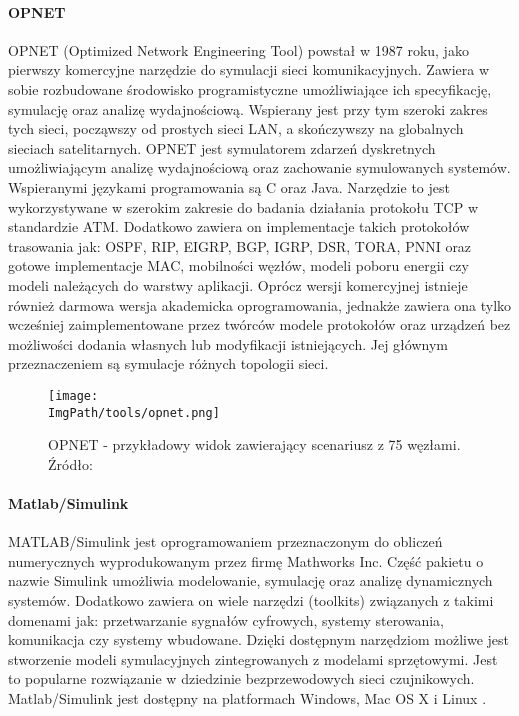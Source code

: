 \paragraph{OPNET \cite{Fahmy2016}}
OPNET (Optimized Network Engineering Tool) powstał w 1987 roku, jako pierwszy komercyjne narzędzie do symulacji sieci komunikacyjnych. Zawiera w sobie rozbudowane środowisko programistyczne umożliwiające ich specyfikację, symulację oraz analizę wydajnościową. Wspierany jest przy tym szeroki zakres tych sieci, począwszy od prostych sieci LAN, a skończywszy na globalnych sieciach satelitarnych. OPNET jest symulatorem zdarzeń dyskretnych umożliwiającym analizę wydajnościową oraz zachowanie symulowanych systemów. Wspieranymi językami programowania są C oraz Java. Narzędzie to jest wykorzystywane w szerokim zakresie do badania działania protokołu TCP w standardzie ATM. Dodatkowo zawiera on implementacje takich protokołów trasowania jak: OSPF, RIP, EIGRP, BGP, IGRP, DSR, TORA, PNNI oraz gotowe implementacje MAC, mobilności węzłów, modeli poboru energii czy modeli należących do warstwy aplikacji.
Oprócz wersji komercyjnej istnieje również darmowa wersja akademicka oprogramowania, jednakże zawiera ona tylko wcześniej zaimplementowane przez twórców modele protokołów oraz urządzeń bez możliwości dodania własnych lub modyfikacji istniejących. Jej głównym przeznaczeniem są symulacje różnych topologii sieci.
\begin{figure}[H]
	\begin{center}
		\centering
		\texttt{[image: \\ImgPath/tools/opnet.png]} 
	\end{center}
	\caption{OPNET - przykładowy widok zawierający scenariusz z 75 węzłami. Źródło: \cite{MarghescuC.2011Soaw}}
	\label{opnet}
\end{figure}
\paragraph{Matlab/Simulink}
MATLAB/Simulink jest oprogramowaniem przeznaczonym do obliczeń numerycznych wyprodukowanym przez firmę Mathworks Inc.  Część pakietu o nazwie Simulink umożliwia modelowanie, symulację oraz analizę dynamicznych systemów. Dodatkowo zawiera on wiele narzędzi (toolkits) związanych z takimi domenami jak: przetwarzanie sygnałów cyfrowych, systemy sterowania, komunikacja czy systemy wbudowane. Dzięki dostępnym narzędziom możliwe jest stworzenie modeli symulacyjnych zintegrowanych z modelami sprzętowymi. Jest to popularne rozwiązanie w dziedzinie bezprzewodowych sieci czujnikowych. Matlab/Simulink jest dostępny na platformach Windows, Mac OS X i Linux \cite{Rajaram2016}. 
